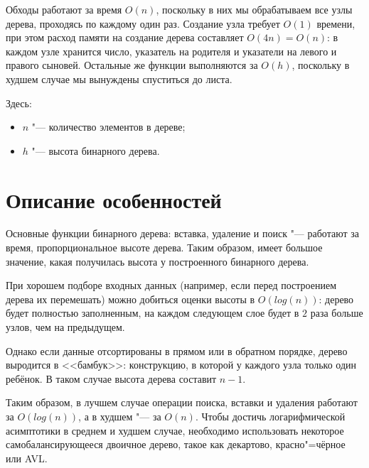 \documentclass[otchet]{../SCWorks}
\begin{document}
Обходы работают за время $O(n)$, поскольку в них мы обрабатываем все узлы дерева, проходясь по каждому один раз. Создание узла требует $O(1)$ времени, при этом расход памяти на создание дерева составляет $O(4n) = O(n)$: в каждом узле хранится число, указатель на родителя и указатели на левого и правого сыновей. Остальные же функции выполняются за $O(h)$, поскольку в худшем случае мы вынуждены спуститься до листа.

Здесь:
\begin{itemize}
	\item[$\bullet$] $n$ "--- количество элементов в дереве;
	\item[$\bullet$] $h$ "--- высота бинарного дерева.
\end{itemize}

\section{Описание особенностей}

Основные функции бинарного дерева: вставка, удаление и поиск "--- работают за время, пропорциональное высоте дерева. Таким образом, имеет большое значение, какая получилась высота у построенного бинарного дерева.

При хорошем подборе входных данных (например, если перед построением дерева их перемешать) можно добиться оценки высоты в $O(log(n))$: дерево будет полностью заполненным, на каждом следующем слое будет в $2$ раза больше узлов, чем на предыдущем.

Однако если данные отсортированы в прямом или в обратном порядке, дерево выродится в <<бамбук>>: конструкцию, в которой у каждого узла только один ребёнок. В таком случае высота дерева составит $n - 1$.

Таким образом, в лучшем случае операции поиска, вставки и удаления работают за $O(log(n))$, а в худшем "--- за $O(n)$. Чтобы достичь логарифмической асимптотики в среднем и худшем случае, необходимо использовать некоторое самобалансирующееся двоичное дерево, такое как декартово, красно"=чёрное или AVL.






\appendix
\end{document}
